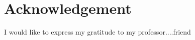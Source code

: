 \chapter*{Acknowledgement}
I would like to express my gratitude to my professor....friend\\

\lipsum[1-5] %